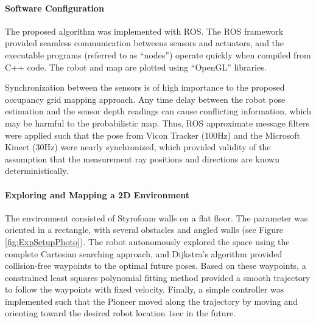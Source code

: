 \documentclass[smallextended]{svjour3}       %
\begin{document}
\paragraph{Software Configuration}
The proposed algorithm was implemented with ROS. The ROS framework provided seamless communication betweens sensors and actuators, and the executable programs (referred to as ``nodes'') operate quickly when compiled from C++ code. The robot and map are plotted using ``OpenGL'' libraries.

Synchronization between the sensors is of high importance to the proposed occupancy grid mapping approach. Any time delay between the robot pose estimation and the sensor depth readings can cause conflicting information, which may be harmful to the probabilistic map. Thus, ROS approximate message filters were applied such that the pose from Vicon Tracker ($100$Hz) and the Microsoft Kinect ($30$Hz) were nearly synchronized, which provided validity of the assumption that the measurement ray positions and directions are known deterministically.

\paragraph{Exploring and Mapping a 2D Environment}
The environment consisted of Styrofoam walls on a flat floor. The parameter was oriented in a rectangle, with several obstacles and angled walls (see Figure \ref{fig:ExpSetupPhoto}). The robot autonomously explored the space using the complete Cartesian searching approach, and Dijkstra's algorithm provided collision-free waypoints to the optimal future poses. Based on these waypoints, a constrained least squares polynomial fitting method provided a smooth trajectory to follow the waypoints with fixed velocity. Finally, a simple controller was implemented such that the Pioneer moved along the trajectory by moving and orienting toward the desired robot location $1$sec in the future.
\end{document}
